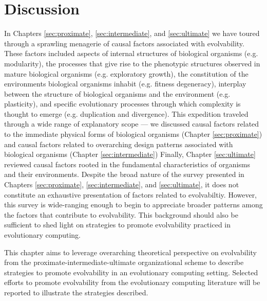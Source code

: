 \chapter{Discussion} \label{sec:discussion}

In Chapters \ref{sec:proximate}, \ref{sec:intermediate}, and \ref{sec:ultimate} we have toured through a sprawling menagerie of causal factors associated with evolvability.
These factors included aspects of internal structures of biological organisms (e.g. modularity), the processes that give rise to the phenotypic structures observed in mature biological organisms (e.g. exploratory growth), the constitution of the environments biological organisms inhabit (e.g. fitness degeneracy), interplay between the structure of biological organisms and the environment (e.g. plasticity), and specific evolutionary processes through which complexity is thought to emerge (e.g. duplication and divergence).
This expedition traveled through a wide range of explanatory scope --- we discussed causal factors related to the immediate physical forms of biological organisms (Chapter \ref{sec:proximate}) and causal factors related to overarching design patterns associated with biological organisms (Chapter \ref{sec:intermediate})
Finally, Chapter \ref{sec:ultimate} reviewed causal factors rooted in the fundamental characteristics of organisms and their environments.
Despite the broad nature of the survey presented in Chapters \ref{sec:proximate}, \ref{sec:intermediate}, and \ref{sec:ultimate}, it does not constitute an exhaustive presentation of factors related to evolvabiltiy.
However, this survey is wide-ranging enough to begin to appreciate broader patterns among the factors that contribute to evolvability.
This background should also be sufficient to shed light on strategies to promote evolvability practiced in evolutionary computing.

This chapter aims to leverage overarching theoretical perspective on evolvability from the proximate-intermediate-ultimate organizational scheme to describe strategies to promote evolvability in an evolutionary computing setting. Selected efforts to promote evolvability from the evolutionary computing literature will be reported to illustrate the strategies described.

